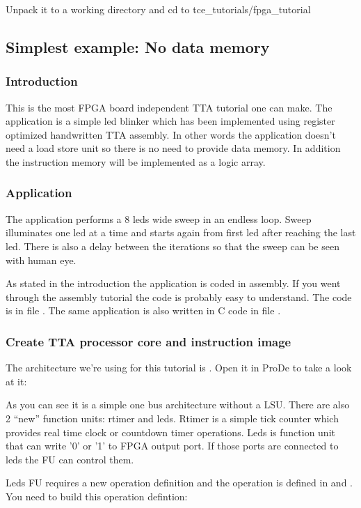 \documentclass[twoside]{tceusermanual}
\begin{document}
Unpack it to a working directory and cd to tce\_tutorials/fpga\_tutorial

\subsection{Simplest example: No data memory}
\subsubsection{Introduction}
This is the most FPGA board independent TTA tutorial one can make. The
application is a simple led blinker which has been implemented using register
optimized handwritten TTA assembly. In other words the application
doesn't need a load store unit so there is no need to provide data memory. In
addition the instruction memory will be implemented as a logic array.

\subsubsection{Application}
The application performs a 8 leds wide sweep in an endless loop. Sweep 
illuminates one led at a time and starts again from first led after reaching
the last led. There is also a delay between the iterations so that the sweep
can be seen with human eye.

As stated in the introduction the application is coded in assembly. If you went
through the assembly tutorial the code is probably easy to understand. The code
is in file . The same application is also written in C code
in file .

\subsubsection{Create TTA processor core and instruction image}
The architecture we're using for this tutorial is . Open it
in ProDe to take a look at it:


As you can see it is a simple one bus architecture without a LSU. There are
also 2 ``new'' function units: rtimer and leds. Rtimer is a simple tick
counter which provides real time clock or countdown timer operations. Leds is
function unit that can write '0' or '1' to FPGA output port. If those ports
are connected to leds the FU can control them.

Leds FU requires a new operation definition and the operation is defined in
 and . You need to build this operation defintion:
\end{document}
